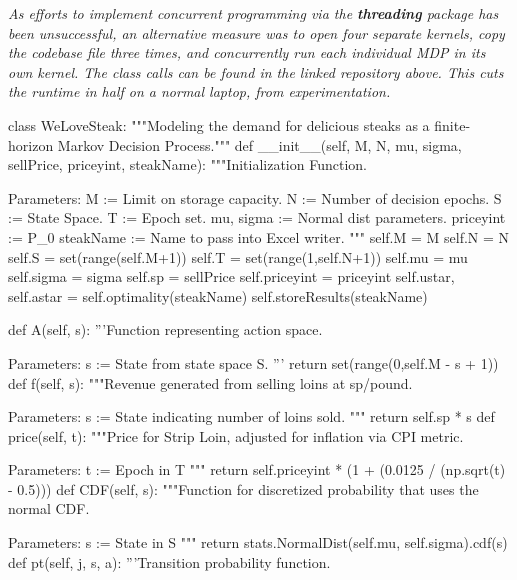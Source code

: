 \documentclass[12pt,a4paper]{article}
\begin{document}
\textit{As efforts to implement concurrent programming via the \textbf{threading} package has been unsuccessful, an alternative measure was to open four separate kernels, copy the codebase file three times, and concurrently run each individual MDP in its own kernel. The class calls can be found in the linked repository above. This cuts the runtime in half on a normal laptop, from experimentation.}
\\
\newpage

\small 

\begin{python}
class WeLoveSteak:
    """Modeling the demand for delicious steaks as a finite-horizon Markov Decision Process."""
    def __init__(self, M, N, mu, sigma, sellPrice, priceyint, steakName):
        """Initialization Function.
        
        Parameters:
        M := Limit on storage capacity.
        N := Number of decision epochs.
        S := State Space. T := Epoch set.
        mu, sigma := Normal dist parameters.
        priceyint := P_0
        steakName := Name to pass into Excel writer.
        """
        self.M = M
        self.N = N
        self.S = set(range(self.M+1))
        self.T = set(range(1,self.N+1))
        self.mu = mu
        self.sigma = sigma
        self.sp = sellPrice
        self.priceyint = priceyint
        self.ustar, self.astar = self.optimality(steakName)
        self.storeResults(steakName)
        
    def A(self, s):
        '''Function representing action space.
        
        Parameters:
        s := State from state space S.
        '''
        return set(range(0,self.M - s + 1))
    def f(self, s):
        """Revenue generated from selling loins at sp/pound.
        
        Parameters:
        s := State indicating number of loins sold.
        """
        return self.sp * s
    def price(self, t):
        """Price for Strip Loin, adjusted for inflation via CPI metric.
        
        Parameters:
        t := Epoch in T
        """
        return self.priceyint * (1 + (0.0125 / (np.sqrt(t) - 0.5)))
    def CDF(self, s):
        """Function for discretized probability that uses the normal CDF.
        
        Parameters:
        s := State in S
        """
        return stats.NormalDist(self.mu, self.sigma).cdf(s)
    def pt(self, j, s, a):
        '''Transition probability function.
            

\end{python}
\end{document}
